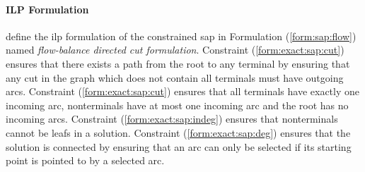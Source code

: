  \paragraph{ILP Formulation}
 \cite{gamrath2017scip} define the \gls{ilp} formulation of the constrained \gls{sap} in Formulation (\ref{form:sap:flow})
 named \textit{flow-balance directed cut formulation}. Constraint (\ref{form:exact:sap:cut}) ensures that there exists a
  path from the root to any terminal by ensuring that any
 cut in the graph which does not contain all terminals must have outgoing arcs. Constraint (\ref{form:exact:sap:cut})
 ensures that all terminals have exactly one incoming arc, nonterminals have at most one incoming arc and the root has
 no incoming arcs. Constraint (\ref{form:exact:sap:indeg}) ensures that nonterminals cannot be leafs in a solution.
 Constraint (\ref{form:exact:sap:deg}) ensures that the solution is connected by ensuring that an arc can only be selected
 if its starting point is pointed to by a selected arc.

